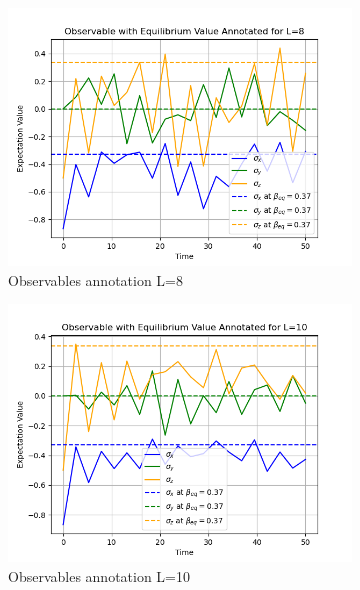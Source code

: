 \documentclass[12pt]{article}
\begin{document}
\begin{figure}[htbp]
    \begin{subfigure}[b]{0.32\textwidth}
        \includegraphics[width=\textwidth]{p4_1_2_observables_annotation_L8.png}
        \caption{Observables annotation L=8}
    \end{subfigure}
    \begin{subfigure}[b]{0.32\textwidth}
        \includegraphics[width=\textwidth]{p4_1_2_observables_annotation_L10.png}
        \caption{Observables annotation L=10}
    \end{subfigure}
    \begin{subfigure}[b]{0.32\textwidth}

\end{subfigure}
\end{figure}
\end{document}
